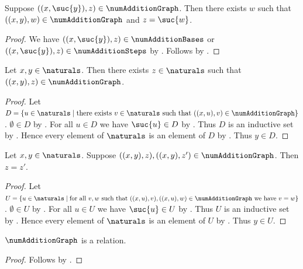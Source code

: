 \begin{proposition}\label{num_addition_graph_successor_elim}
    Suppose $((x,\suc{y}),z)\in\numAdditionGraph$.
    Then there exists $w$ such that
        $((x,y),w)\in\numAdditionGraph$ and $z=\suc{w}$.
\end{proposition}
\begin{proof}
    We have $((x,\suc{y}),z)\in\numAdditionBases$ or
        $((x,\suc{y}),z)\in\numAdditionSteps$
        by .
    Follows by .
\end{proof}

\begin{proposition}\label{num_addition_graph_total}
    Let $x,y\in\naturals$.
    Then there exists $z\in\naturals$ such that
        $((x,y),z)\in\numAdditionGraph$.
\end{proposition}
\begin{proof}
    Let $D=\{u\in\naturals\mid
        \text{there exists $v\in\naturals$ such that
            $((x,u),v)\in\numAdditionGraph$}\}$.
    $\emptyset\in D$
        by .
    For all $u\in D$ we have $\suc{u}\in D$
        by .
    Thus $D$ is an inductive set by .
    Hence every element of $\naturals$ is an element of $D$
        by .
    Thus $y\in D$.
\end{proof}

\begin{proposition}\label{num_addition_graph_unique}
    Let $x,y\in\naturals$.
    Suppose $((x,y),z),((x,y),z')\in\numAdditionGraph$.
    Then $z=z'$.
\end{proposition}
\begin{proof}
    Let $U=\{u\in\naturals\mid
        \text{for all $v,w$ such that
            $((x,u),v),((x,u),w)\in\numAdditionGraph$
            we have $v=w$}\}$.
    $\emptyset\in U$
        by .
    For all $u\in U$ we have $\suc{u}\in U$
        by .
    Thus $U$ is an inductive set by .
    Hence every element of $\naturals$ is an element of $U$
        by .
    Thus $y\in U$.
\end{proof}

\begin{proposition}\label{num_addition_graph_relation}
    $\numAdditionGraph$ is a relation.
\end{proposition}
\begin{proof}
    Follows by .
\end{proof}

